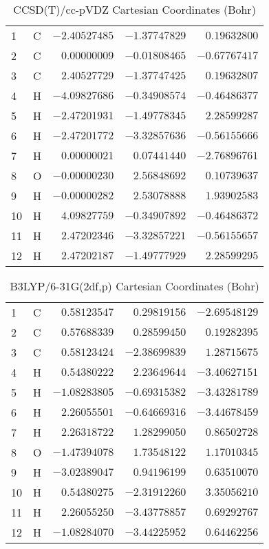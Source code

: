 \documentclass[10pt,oneside]{article}
\begin{document}
\begin{table}[h!]
\centering
\caption{CCSD(T)/cc-pVDZ Cartesian Coordinates (Bohr)}
\begin{tabular}{llrrr}
1  & C  & $-2.40527485$ & $-1.37747829$ & $ 0.19632800$ \\
2  & C  & $ 0.00000009$ & $-0.01808465$ & $-0.67767417$ \\
3  & C  & $ 2.40527729$ & $-1.37747425$ & $ 0.19632807$ \\
4  & H  & $-4.09827686$ & $-0.34908574$ & $-0.46486377$ \\
5  & H  & $-2.47201931$ & $-1.49778345$ & $ 2.28599287$ \\
6  & H  & $-2.47201772$ & $-3.32857636$ & $-0.56155666$ \\
7  & H  & $ 0.00000021$ & $ 0.07441440$ & $-2.76896761$ \\
8  & O  & $-0.00000230$ & $ 2.56848692$ & $ 0.10739637$ \\
9  & H  & $-0.00000282$ & $ 2.53078888$ & $ 1.93902583$ \\
10 & H  & $ 4.09827759$ & $-0.34907892$ & $-0.46486372$ \\
11 & H  & $ 2.47202346$ & $-3.32857221$ & $-0.56155657$ \\
12 & H  & $ 2.47202187$ & $-1.49777929$ & $ 2.28599295$ \\
\end{tabular}
\end{table}

\begin{table}[h!]
\centering
\caption{B3LYP/6-31G(2df,p) Cartesian Coordinates (Bohr)}
\begin{tabular}{llrrr}
1  & C  & $ 0.58123547$ & $ 0.29819156$ & $-2.69548129$ \\
2  & C  & $ 0.57688339$ & $ 0.28599450$ & $ 0.19282395$ \\
3  & C  & $ 0.58123424$ & $-2.38699839$ & $ 1.28715675$ \\
4  & H  & $ 0.54380222$ & $ 2.23649644$ & $-3.40627151$ \\
5  & H  & $-1.08283805$ & $-0.69315382$ & $-3.43281789$ \\
6  & H  & $ 2.26055501$ & $-0.64669316$ & $-3.44678459$ \\
7  & H  & $ 2.26318722$ & $ 1.28299050$ & $ 0.86502728$ \\
8  & O  & $-1.47394078$ & $ 1.73548122$ & $ 1.17010345$ \\
9  & H  & $-3.02389047$ & $ 0.94196199$ & $ 0.63510070$ \\
10 & H  & $ 0.54380275$ & $-2.31912260$ & $ 3.35056210$ \\
11 & H  & $ 2.26055250$ & $-3.43778857$ & $ 0.69292767$ \\
12 & H  & $-1.08284070$ & $-3.44225952$ & $ 0.64462256$ \\
\end{tabular}
\end{table}
\end{document}
